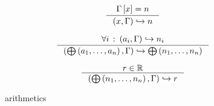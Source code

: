\begin{figure}[h!]
\centering
\begin{minipage}{0.85\linewidth}
\begin{center}
  \[
  \inference
    {\env\brackets{\var} = n}
    {\parens{\var, \env}
      \evalsto{n}}
    {}
  \]

  \[
  \inference
    {\forall i \st \parens{\aexpr_i, \env} \evalsto n_i}
    {\parens{\op\parens{\aexpr_1, \ldots, \aexpr_n}, \env}
      \evalsto \op\parens{n_1, \ldots, n_n}}
    {}
  \]

  \[
  \inference
    {r \in \R}
    {\parens{\op\parens{n_1, \ldots, n_n}, \env}
      \evalsto r}
    {}
  \]
\end{center}
\end{minipage}
\caption{\imp{} arithmetics}
\end{figure}

